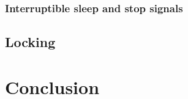 \documentclass[shortabstract, manyadvisors, english, mgr]{iithesis}
\begin{document}
\subsection{Interruptible sleep and stop signals}
\section{Locking}
\chapter{Conclusion}



\end{document}
